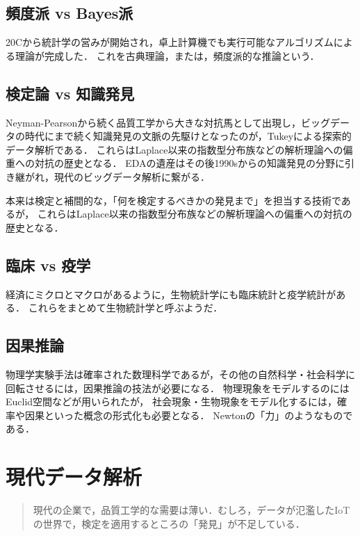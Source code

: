 \documentclass[uplatex,dvipdfmx]{jsreport}
\begin{document}
\section{頻度派 vs Bayes派}

20Cから統計学の営みが開始され，卓上計算機でも実行可能なアルゴリズムによる理論が完成した．
これを古典理論，または，頻度派的な推論という．

\section{検定論 vs 知識発見}

Neyman-Pearsonから続く品質工学から大きな対抗馬として出現し，ビッグデータの時代にまで続く知識発見の文脈の先駆けとなったのが，Tukeyによる探索的データ解析である．
これらはLaplace以来の指数型分布族などの解析理論への偏重への対抗の歴史となる．
EDAの遺産はその後1990sからの知識発見の分野に引き継がれ，現代のビッグデータ解析に繋がる．

本来は検定と補間的な，「何を検定するべきかの発見まで」を担当する技術であるが，
これらはLaplace以来の指数型分布族などの解析理論への偏重への対抗の歴史となる．

\section{臨床 vs 疫学}

経済にミクロとマクロがあるように，生物統計学にも臨床統計と疫学統計がある．
これらをまとめて生物統計学と呼ぶようだ．

\section{因果推論}

物理学実験手法は確率された数理科学であるが，その他の自然科学・社会科学に
回転させるには，因果推論の技法が必要になる．
物理現象をモデルするのにはEuclid空間などが用いられたが，
社会現象・生物現象をモデル化するには，確率や因果といった概念の形式化も必要となる．
Newtonの「力」のようなものである．

\chapter{現代データ解析}

\begin{quotation}
    現代の企業で，品質工学的な需要は薄い．むしろ，データが氾濫したIoTの世界で，検定を適用するところの「発見」が不足している．
\end{quotation}
\end{document}
